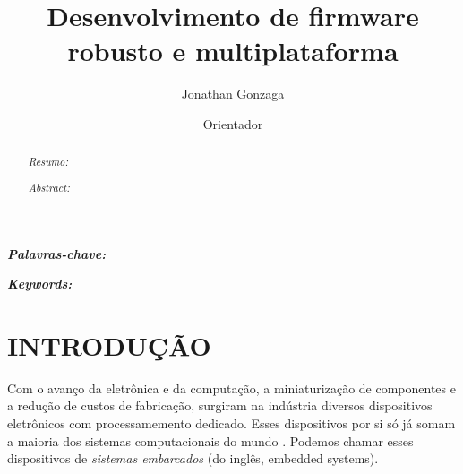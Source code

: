 \documentclass[times, twoside, watermark]{artigo}
\begin{document}

\title{\Large {Desenvolvimento de firmware robusto e multiplataforma}}

\author[1]{Jonathan Gonzaga}
\author[2]{Orientador}


\maketitle


\begin{abstract}
\textit{Resumo:} 
\end {abstract}

\begin{keywords}
\textit{\textbf{Palavras-chave: }}
\end{keywords}

\begin{abstract}
\textit{Abstract:} 
\end {abstract}
\begin{keywords}
\textit{\textbf{Keywords: }}
\end{keywords}


\section{INTRODUÇÃO}
Com o avanço da eletrônica e da computação, a miniaturização de componentes e a redução de custos de fabricação, surgiram na indústria diversos dispositivos eletrônicos com processamemento dedicado. Esses dispositivos por si só já somam a maioria dos sistemas computacionais do mundo \cite{eetimes}. Podemos chamar esses dispositivos de \textit{sistemas embarcados} (do inglês, embedded systems).
\end{document}
